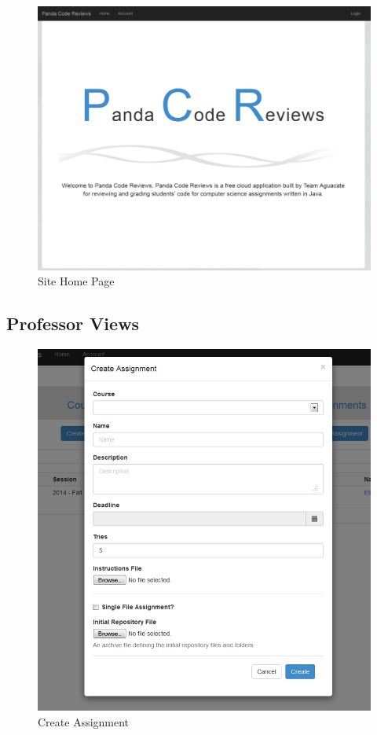 
\begin{figure}[H]
	\centering
	\includegraphics[width=\textwidth]{img/home-screen}
	\caption{Site Home Page}
\end{figure}

\subsection{Professor Views}

\begin{figure}[H]
	\centering
	\includegraphics[width=\textwidth]{img/createassign-screen}
	\caption{Create Assignment}
\end{figure}

